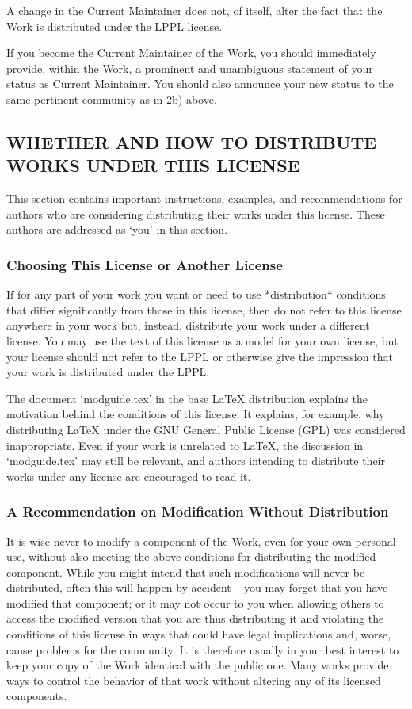 A change in the Current Maintainer does not, of itself, alter the fact
that the Work is distributed under the LPPL license.

If you become the Current Maintainer of the Work, you should
immediately provide, within the Work, a prominent and unambiguous
statement of your status as Current Maintainer.  You should also
announce your new status to the same pertinent community as
in 2b) above.


\subsection{WHETHER AND HOW TO DISTRIBUTE WORKS UNDER THIS LICENSE}

This section contains important instructions, examples, and
recommendations for authors who are considering distributing their
works under this license.  These authors are addressed as `you' in
this section.

\subsubsection{Choosing This License or Another License}

If for any part of your work you want or need to use *distribution*
conditions that differ significantly from those in this license, then
do not refer to this license anywhere in your work but, instead,
distribute your work under a different license.  You may use the text
of this license as a model for your own license, but your license
should not refer to the LPPL or otherwise give the impression that
your work is distributed under the LPPL.

The document `modguide.tex' in the base LaTeX distribution explains
the motivation behind the conditions of this license.  It explains,
for example, why distributing LaTeX under the GNU General Public
License (GPL) was considered inappropriate.  Even if your work is
unrelated to LaTeX, the discussion in `modguide.tex' may still be
relevant, and authors intending to distribute their works under any
license are encouraged to read it.

\subsubsection{A Recommendation on Modification Without Distribution}

It is wise never to modify a component of the Work, even for your own
personal use, without also meeting the above conditions for
distributing the modified component.  While you might intend that such
modifications will never be distributed, often this will happen by
accident -- you may forget that you have modified that component; or
it may not occur to you when allowing others to access the modified
version that you are thus distributing it and violating the conditions
of this license in ways that could have legal implications and, worse,
cause problems for the community.  It is therefore usually in your
best interest to keep your copy of the Work identical with the public
one.  Many works provide ways to control the behavior of that work
without altering any of its licensed components.

